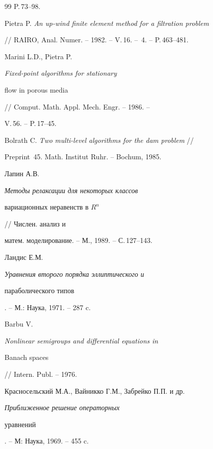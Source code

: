 \begin{thebibliography}{99}
P.\,73--98.




Pietra P. {\em An up-wind finite element method for a filtration problem}


// RAIRO, Anal. Numer. -- 1982. -- V.\,16. -- \No\,4. -- P.\,463--481.




Marini L.D., Pietra P. {\em Fixed-point algorithms for stationary


flow in porous media} // Comput. Math. Appl. Mech. Engr. -- 1986. --


V.\,56. -- P.\,17--45.




Bolrath C. {\em Two multi-level algorithms for the dam problem} //


Preprint \No\,45. Math. Institut Ruhr. -- Bochum, 1985.




Лапин А.В. {\em Методы релаксации для некоторых классов


вариационных неравенств в $R^n$} // Числен. анализ и


матем. моделирование. -- М., 1989. -- С.\,127--143.




Ландис Е.М. {\em Уравнения второго порядка эллиптического и


параболического типов}. -- М.: Наука, 1971. -- 287 c.




Barbu V. {\em Nonlinear semigroups and differential equations in


Banach spaces} // Intern. Publ. -- 1976.




Красносельский М.А., Вайникко Г.М., Забрейко П.П. и др.


{\em Приближенное решение операторных


уравнений}. -- М: Наука, 1969. -- 455 c.





\end{thebibliography}





\vskip 2cm












\label{end}





